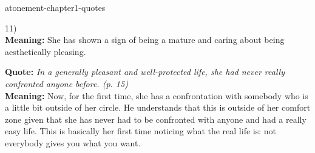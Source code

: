 \documentclass[preview]{standalone}
\begin{document}
\begin{snippet}{atonement-chapter1-quotes}
\begin{minipage}[r]{0.95\textwidth}
{        11)
    }
    \\
    \textbf{Meaning:} She has shown a sign of being a mature and caring about being aesthetically pleasing.
\end{minipage}
\hr
\begin{minipage}[l]{0.05\textwidth}
\end{minipage}
\begin{minipage}[r]{0.95\textwidth}
    \textbf{Quote:} \textit{
        In a generally pleasant and well-protected life, she had
        never really confronted anyone before. (p. 15)
    }
    \\
    \textbf{Meaning:}
    Now, for the first time, she has a confrontation with somebody who is a little bit outside of her
    circle. He understands that this is outside of her comfort zone given that she has never had
    to be confronted with anyone and had a really easy life.
    This is basically her first time noticing what the real life is: not everybody gives you what you want.
\end{minipage}
\end{snippet}
\end{document}
